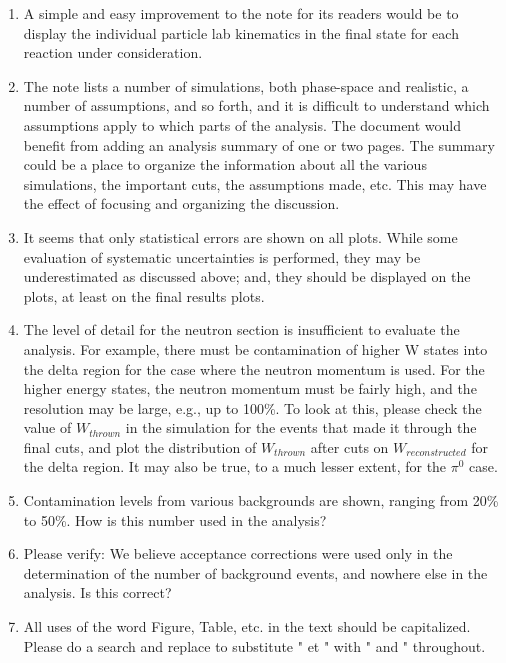 \documentclass[11pt]{paper}
\begin{document}
\begin{enumerate}
\item A simple and easy improvement to the note for its readers would be to display the individual particle lab kinematics in the final state for each reaction under consideration.

\item The note lists a number of simulations, both phase-space and realistic, a number of assumptions, and so forth, and it is difficult to understand which assumptions apply to which parts of the analysis. The document would benefit from adding an analysis summary of one or two pages. The summary could be a place to organize the information about all the various simulations, the important cuts, the assumptions made, etc. This may have the effect of focusing and organizing the discussion. 

\item It seems that only statistical errors are shown on all plots. While some evaluation of systematic uncertainties is performed, they may be underestimated as discussed above; and, they should be displayed on the plots, at least on the final results plots.

\item The level of detail for the neutron section is insufficient to evaluate the analysis. For example, there must be contamination of higher W states into the delta region for the case where the neutron momentum is used. For the higher energy states, the neutron momentum must be fairly high, and the resolution may be large, e.g., up to 100\%. To look at this, please check the value of $W_{thrown}$ in the simulation for the events that made it through the final cuts, and plot the distribution of $W_{thrown}$ after cuts on $W_{reconstructed}$ for the delta region. It may also be true, to a much lesser extent, for the $\pi^0$ case. 

\item Contamination levels from various backgrounds are shown, ranging from 20\% to 50\%. How is this number used in the analysis? 

\item Please verify: We believe acceptance corrections were used only in the determination of the number of background events, and nowhere else in the analysis. Is this correct? 

\item All uses of the word Figure, Table, etc. in the text should be capitalized. 
Please do a search and replace to substitute " et " with " and " throughout.

\end{enumerate} 
\end{document}

